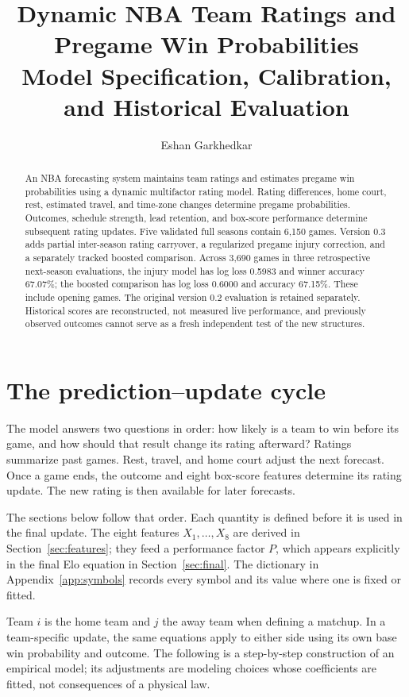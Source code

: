 \documentclass[11pt]{article}
\title{Dynamic NBA Team Ratings and Pregame Win Probabilities\\
\large Model Specification, Calibration, and Historical Evaluation}
\author{Eshan Garkhedkar}
\date{}
\begin{document}
\maketitle
\begin{abstract}
An NBA forecasting system maintains team ratings and estimates pregame win
probabilities using a dynamic multifactor rating model. Rating differences, home court, rest, estimated travel, and time-zone
changes determine pregame probabilities. Outcomes, schedule strength, lead
retention, and box-score performance determine subsequent rating updates.
Five validated full seasons contain 6,150 games. Version 0.3 adds partial
inter-season rating carryover, a regularized pregame injury correction, and
a separately tracked boosted comparison. Across 3,690 games in three
retrospective next-season evaluations, the injury model has log loss 0.5983
and winner accuracy 67.07\%; the boosted comparison has log loss 0.6000 and
accuracy 67.15\%. These include opening games. The original version 0.2
evaluation is retained separately. Historical scores are reconstructed,
not measured live performance, and previously observed outcomes cannot
serve as a fresh independent test of the new structures.
\end{abstract}

\section{The prediction--update cycle}
The model answers two questions in order: how likely is a team to win before
its game, and how should that result change its rating afterward? Ratings
summarize past games. Rest, travel, and home court adjust the next forecast.
Once a game ends, the outcome and eight box-score features determine its
rating update. The new rating is then available for later forecasts.

The sections below follow that order. Each quantity is defined before it is
used in the final update. The eight features $X_1,\ldots,X_8$ are derived in
Section~\ref{sec:features}; they feed a performance factor $P$, which appears
explicitly in the final Elo equation in Section~\ref{sec:final}.
The dictionary in Appendix~\ref{app:symbols} records every symbol and its value
where one is fixed or fitted.

Team $i$ is the home team and $j$ the away team when defining a matchup.
In a team-specific update, the same equations apply to either side using its
own base win probability and outcome. The following is a
step-by-step construction of an empirical model; its adjustments are modeling
choices whose coefficients are fitted, not consequences of a physical law.
\end{document}
